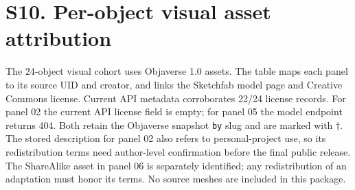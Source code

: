 \documentclass[10pt]{article}
\begin{document}
\section{S10. Per-object visual asset attribution}

The 24-object visual cohort uses Objaverse 1.0 assets. The table maps each panel to its source UID and creator, and links the Sketchfab model page and Creative Commons license. Current API metadata corroborates 22/24 license records. For panel 02 the current API license field is empty; for panel 05 the model endpoint returns 404. Both retain the Objaverse snapshot \texttt{by} slug and are marked with $\dagger$. The stored description for panel 02 also refers to personal-project use, so its redistribution terms need author-level confirmation before the final public release. The ShareAlike asset in panel 06 is separately identified; any redistribution of an adaptation must honor its terms. No source meshes are included in this package.

\small

\end{document}
